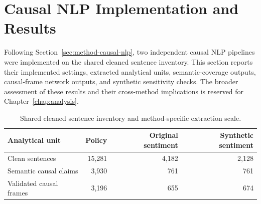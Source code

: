 \section{Causal NLP Implementation and Results}
\label{sec:impl-causal-nlp}

Following Section~\ref{sec:method-causal-nlp}, two independent causal NLP pipelines
were implemented on the shared cleaned sentence inventory. This section reports their
implemented settings, extracted analytical units, semantic-coverage outputs,
causal-frame network outputs, and synthetic sensitivity checks. The broader
assessment of these results and their cross-method implications is reserved for
Chapter~\ref{chap:analysis}.

\begin{table}[!htbp]
\centering
\small
\setlength{\tabcolsep}{5pt}
\begin{tabular}{lrrr}
\hline
Analytical unit & Policy & Original sentiment & Synthetic sentiment \\
\hline
Clean sentences & 15,281 & 4,182 & 2,128 \\
Semantic causal claims & 3,930 & 761 & 761 \\
Validated causal frames & 3,196 & 655 & 674 \\
\hline
\end{tabular}
\caption{Shared cleaned sentence inventory and method-specific extraction scale.}\label{tab:impl-causal-scale}
\end{table}


